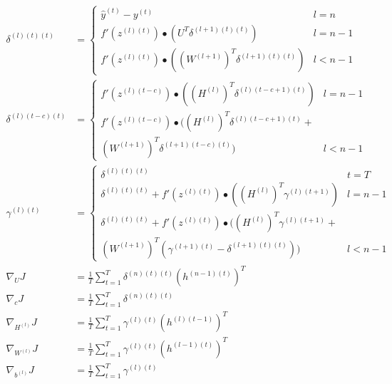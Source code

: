 \documentclass{article}
\begin{document}
	\begin{framed}
	\begin{align}
		\delta^{(l)(t)(t)} &=
		\begin{cases}
			\hat{y}^{(t)} - y^{(t)} &l=n\\	
			f'(z^{(l)(t)}) \bullet (U^T \delta^{(l+1)(t)(t)}) &l=n-1\\
			f'(z^{(l)(t)}) \bullet ((W^{(l+1)})^T \delta^{(l+1)(t)(t)}) &l<n-1
		\end{cases} 
		\\
		\delta^{(l)(t-c)(t)} &=
		\begin{cases}
			f'(z^{(l)(t-c)}) \bullet ((H^{(l)})^T \delta^{(l)(t-c+1)(t)}) &l=n-1 \\
			f'(z^{(l)(t-c)}) \bullet ((H^{(l)})^T \delta^{(l)(t-c+1)(t)} + \\
			 (W^{(l+1)})^T \delta^{(l+1)(t-c)(t)}) &l<n-1
		\end{cases} 
		\\
		\gamma^{(l)(t)} &= 
		\begin{cases}
		\delta^{(l)(t)(t)} &t=T
		\\
		\delta^{(l)(t)(t)} + f'(z^{(l)(t)}) \bullet ((H^{(l)})^T \gamma^{(l)(t+1)}) &l=n-1
		\\
		\delta^{(l)(t)(t)} + f'(z^{(l)(t)}) \bullet ((H^{(l)})^T \gamma^{(l)(t+1)} + \\ (W^{(l+1)})^T (\gamma^{(l+1)(t)} - \delta^{(l+1)(t)(t)})) &l<n-1
		\end{cases}
		\\
		\nabla_{U} J &= \frac{1}{T} \sum_{t=1}^{T}\delta^{(n)(t)(t)} (h^{(n-1)(t)})^T\\
		\nabla_{c} J &= \frac{1}{T} \sum_{t=1}^{T}\delta^{(n)(t)(t)} 
		\\
		\nabla_{H^{(l)}} J &= \frac{1}{T} \sum_{t=1}^{T} \gamma^{(l)(t)} (h^{(l)(t-1)})^T
		\\
		\nabla_{W^{(l)}} J &= \frac{1}{T} \sum_{t=1}^{T} \gamma^{(l)(t)} (h^{(l-1)(t)})^T
		\\
		\nabla_{b^{(l)}} J &= \frac{1}{T} \sum_{t=1}^{T} \gamma^{(l)(t)}
	\end{align}
	\end{framed}
\end{document}
